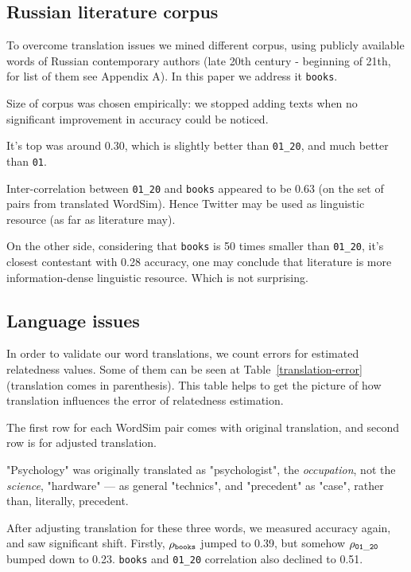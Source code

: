 \documentclass[11pt,letterpaper]{article}
\begin{document}
\subsection{Russian literature corpus}

To overcome translation issues we mined different corpus, using publicly 
available words of Russian contemporary authors (late 20th century - beginning
of 21th, for list of them see Appendix A). In this paper we address it 
{\tt books}.

Size of corpus was chosen empirically: we stopped adding texts when 
no significant improvement in accuracy could be noticed.

It's top was around 0.30, which is slightly better than {\tt 01\_20}, 
and much better than {\tt 01}. 

Inter-correlation between {\tt 01\_20} 
and {\tt books} appeared to be 0.63 (on the set of pairs
from translated WordSim).
Hence Twitter may be used as linguistic resource (as far as literature may). 

On the other side, considering that {\tt books} is 50
times smaller than {\tt 01\_20}, it's closest contestant with 0.28 accuracy, 
one may conclude that literature is more information-dense linguistic resource.
Which is not surprising.


\subsection{Language issues}

In order to validate our word translations, we count errors for estimated
relatedness values. Some of them can be seen at Table~\ref{translation-error} 
(translation comes in parenthesis). 
This table helps to get the picture of how translation influences the error
of relatedness estimation.

The first row for each WordSim pair
comes with original translation, and second row is for adjusted translation.

"Psychology" was originally translated as "psychologist", the {\em occupation}, 
not the {\em science},
"hardware" --- as general "technics", and "precedent" as "case", rather than, 
literally, precedent. 

After adjusting translation for these three words, we measured accuracy again, 
and saw significant shift. Firstly, $ \rho_{\tt books}$ jumped to 0.39, 
but somehow $ \rho_{\tt 01\_20} $ bumped down to 0.23. {\tt books} and {\tt 01\_20}
correlation also declined to 0.51.
\end{document}

